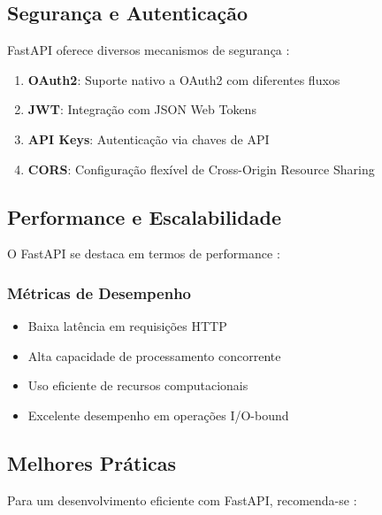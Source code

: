 \subsection{Segurança e Autenticação}

FastAPI oferece diversos mecanismos de segurança \cite{brown2023securing}:

\begin{enumerate}
\item \textbf{OAuth2}: Suporte nativo a OAuth2 com diferentes fluxos
\item \textbf{JWT}: Integração com JSON Web Tokens
\item \textbf{API Keys}: Autenticação via chaves de API
\item \textbf{CORS}: Configuração flexível de Cross-Origin Resource Sharing
\end{enumerate}

\subsection{Performance e Escalabilidade}

O FastAPI se destaca em termos de performance \cite{performance_metrics}:

\subsubsection{Métricas de Desempenho}
\begin{itemize}
\item Baixa latência em requisições HTTP
\item Alta capacidade de processamento concorrente
\item Uso eficiente de recursos computacionais
\item Excelente desempenho em operações I/O-bound
\end{itemize}

\subsection{Melhores Práticas}

Para um desenvolvimento eficiente com FastAPI, recomenda-se \cite{martinez2023best}:

